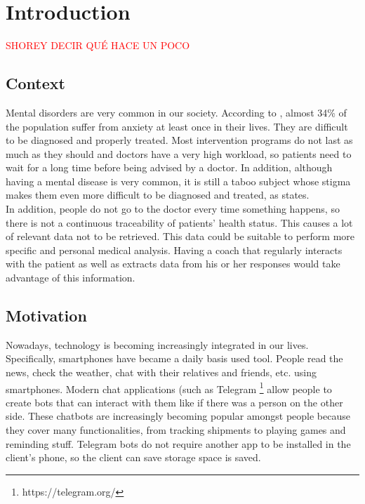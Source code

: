 \documentclass[12pt,english]{article}
\begin{document}


\thispagestyle{empty}
\newpage
\tableofcontents{}
\newpage
\listoffigures
\thispagestyle{empty}
\newpage

\section{Introduction}

\textcolor{red}{SHOREY DECIR QUÉ HACE UN POCO}

\subsection{Context}

Mental disorders are very common in our society. According to \cite{Bandelow2015}, almost 34\% of the population suffer from anxiety at least once in their lives. They are difficult to be diagnosed and properly treated. Most intervention programs do not last as much as they should and doctors have a very high workload, so patients need to wait for a long time before being advised by a doctor. In addition, although having a mental disease is very common, it is still a taboo subject whose stigma makes them even more difficult to be diagnosed and treated, as \cite{Davies2000} states.\\

In addition, people do not go to the doctor every time something happens, so there is not a continuous traceability of patients' health status. This causes a lot of relevant data not to be retrieved. This data could be suitable to perform more specific and personal medical analysis. Having a coach that regularly interacts with the patient as well as extracts data from his or her responses would take advantage of this information.


\subsection{Motivation}

Nowadays, technology is becoming increasingly integrated in our lives. Specifically, smartphones have became a daily basis used tool. People read the news, check the weather, chat with their relatives and friends, etc. using smartphones. Modern chat applications (such as Telegram \footnote{https://telegram.org/} allow people to create bots that can interact with them like if there was a person on the other side. These chatbots are increasingly becoming popular amongst people because they cover many functionalities, from tracking shipments to playing games and reminding stuff. Telegram bots do not require another app to be installed in the client's phone, so the client can save storage space is saved.\\
\end{document}
